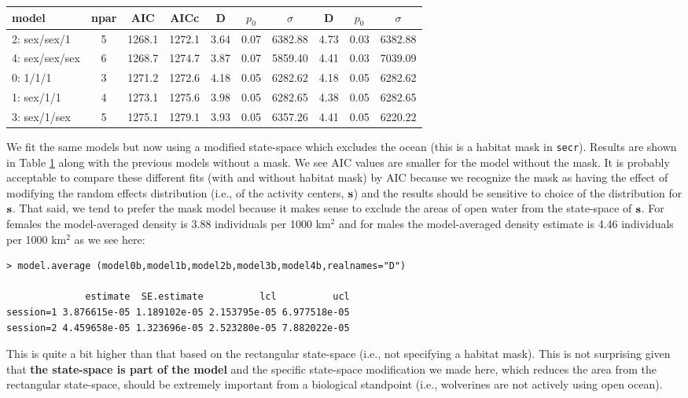 \begin{table}[ht]
\begin{tabular}{lccccccccc}
  model & npar & AIC & AICc & D & $p_0$ & $\sigma$ & D & $p_0$ &  $\sigma$ \\ \hline
2: sex/sex/1   &  5& 1268.1& 1272.1 &  3.64& 0.07& 6382.88& 4.73& 0.03& 6382.88 \\
4: sex/sex/sex &  6& 1268.7& 1274.7 &3.87& 0.07& 5859.40& 4.41& 0.03& 7039.09\\
0: 1/1/1       &  3& 1271.2& 1272.6 &4.18& 0.05& 6282.62& 4.18& 0.05& 6282.62\\
1: sex/1/1     &  4& 1273.1& 1275.6 &3.98& 0.05& 6282.65& 4.38& 0.05& 6282.65\\
3: sex/1/sex   &  5& 1275.1& 1279.1 &3.93& 0.05& 6357.26& 4.41& 0.05& 6220.22\\
\hline
\end{tabular}
\label{gof.tab.aic}
\end{table}


We fit the same models but now using a modified state-space which
excludes the ocean (this is a habitat mask in \mbox{\tt secr}).
 Results are shown in Table \ref{gof.tab.aic} along with
the previous models without a mask.  We see AIC values are smaller for
the model without the mask. It is probably acceptable to compare these
different fits (with and without habitat mask) by AIC because we
recognize the mask as having the effect of modifying the random
effects distribution (i.e., of the activity centers, ${\bf s}$) and
the results should be sensitive to choice of the distribution for
${\bf s}$. That said, we tend to prefer the mask model because it
makes sense to exclude the areas of open water from the state-space of ${\bf
  s}$.  For females the model-averaged density is 3.88 individuals per
1000 km$^2$ and for males the model-averaged density estimate is 4.46
individuals per 1000 km$^2$ as we see here:
{\small
\begin{verbatim}
> model.average (model0b,model1b,model2b,model3b,model4b,realnames="D")

              estimate  SE.estimate          lcl          ucl
session=1 3.876615e-05 1.189102e-05 2.153795e-05 6.977518e-05
session=2 4.459658e-05 1.323696e-05 2.523280e-05 7.882022e-05
\end{verbatim}
}
This is quite a bit higher than that based on the rectangular state-space
(i.e., not specifying a habitat mask). This is not surprising given
that {\bf the state-space is part of the model} and the specific
state-space modification we made here, which reduces the area from the
rectangular state-space, should be extremely important
from a biological standpoint (i.e., wolverines are not actively using 
open ocean). 

